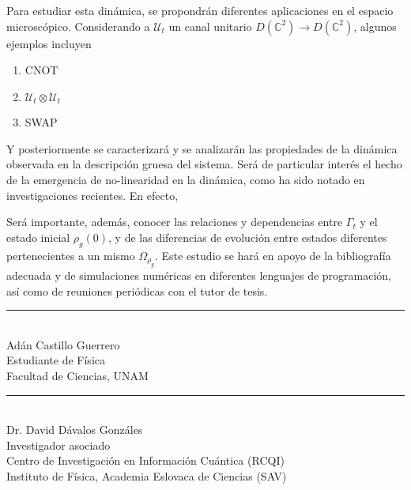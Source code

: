\documentclass[onecolumn,10pt]{article}
\newcommand{\mcU}{\mathcal{U}}
\newcommand{\Complex}{\mathbb{C}} %
\begin{document}
Para estudiar esta dinámica, se propondrán diferentes aplicaciones en el espacio microscópico. Considerando a $\mcU_{t}$ un canal unitario $D(\Complex^{2})\rightarrow D(\Complex^{2})$, algunos ejemplos incluyen
    \begin{multicols}{3}
    \begin{enumerate}
        \item \textsc{CNOT}
        \item $\mcU_{t}\otimes \mcU_{t}$
        \item \textsc{SWAP}
    \end{enumerate}
    \end{multicols}
Y posteriormente se caracterizará y se analizarán las propiedades de la dinámica observada en la descripción gruesa del sistema. Será de particular interés el hecho de la emergencia de no-linearidad en la dinámica, como ha sido notado en investigaciones recientes\cite{Macro-To-Micro}\cite{CGEmergingDynamics}. En efecto,



Será importante, además, conocer las relaciones y dependencias entre $\Gamma_{t}$ y el estado inicial $\rho_{g}(0)$, y de las diferencias de evolución entre estados diferentes pertenecientes a un mismo $\Omega_{\rho_{g}}$. Este estudio se hará en apoyo de la bibliografía adecuada y de simulaciones numéricas en diferentes lenguajes de programación, así como de reuniones periódicas con el tutor de tesis.

\vspace{3.0cm}


\begin{center}
    \rule{200pt}{0.4pt}\\
    Adán Castillo Guerrero \\
    Estudiante de Física \\
    Facultad de Ciencias, UNAM \\
    
\end{center}

\vspace{1.0cm}

\begin{center}
    \rule{200pt}{0.4pt}\\
    Dr. David Dávalos Gonzáles \\
    Investigador asociado\\
    Centro de Investigación en Información Cuántica (RCQI)\\
    Instituto de Física, Academia Eslovaca de Ciencias (SAV)
\end{center}


\end{document}
